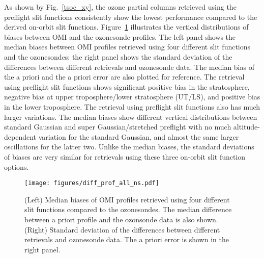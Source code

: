 \documentclass[amt,manuscript]{copernicus}
\begin{document}
As shown by Fig.~\ref{tsoc_xy}, the ozone partial columns retrieved using the preflight slit functions consistently show the lowest performance compared to the derived on-orbit slit functions. Figure~\ref{diff_prof_ns} illustrates the vertical distributions of biases between OMI and the ozonesonde profiles. The left panel shows the median biases between OMI profiles retrieved using four different slit functions and the ozonesondes; the right panel shows the standard deviation of the differences between different retrievals and ozonesonde data. The median bias of the a priori and the a priori error are also plotted for reference. The retrieval using preflight slit functions shows significant positive bias in the stratosphere, negative bias at upper troposphere/lower stratosphere (UT/LS), and positive bias in the lower troposphere. The retrieval using preflight slit functions also has much larger variations. The median biases show different vertical distributions between standard Gaussian and super Gaussian/stretched preflight with no much altitude-dependent variation for the standard Gaussian, and almost the same larger oscillations for the latter two. Unlike the median biases, the standard deviations of biases are very similar for retrievals using these three on-orbit slit function options.

\begin{figure}[t]
\texttt{[image: figures/diff\_prof\_all\_ns.pdf]}
\caption{(Left) Median biases of OMI profiles retrieved using four different slit functions compared to the ozonesondes. The median difference between a priori profile and the ozonsonde data is also shown. (Right) Standard deviation of the differences between different retrievals and ozonesonde data. The a priori error is shown in the right panel.}
\label{diff_prof_ns}
\end{figure}
\end{document}
